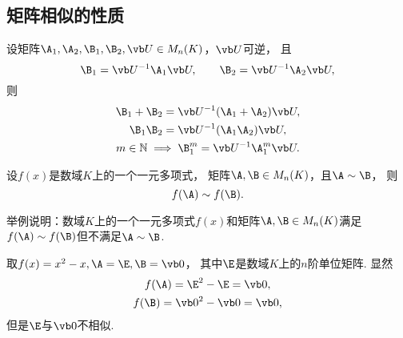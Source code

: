 \subsection{矩阵相似的性质}
\begin{proposition}
设矩阵\(\A_1,\A_2,\B_1,\B_2,\P \in M_n(K)\)，\(\P\)可逆，
且\[
	\B_1=\P^{-1}\A_1\P, \qquad
	\B_2=\P^{-1}\A_2\P,
\]
则\begin{gather}
	\B_1 + \B_2 = \P^{-1} (\A_1 + \A_2) \P, \\
	\B_1 \B_2 = \P^{-1} (\A_1 \A_2) \P, \\
	m\in\mathbb{N} \implies \B_1^m = \P^{-1}\A_1^m\P.
		\label{equation:相似矩阵.利用相似性简化计算}
\end{gather}
\end{proposition}
\begin{corollary}\label{theorem:相似矩阵.相似矩阵的多项式相似}
设\(f(x)\)是数域\(K\)上的一个一元多项式，
矩阵\(\A,\B \in M_n(K)\)，且\(\A \sim \B\)，
则\[
	f(\A) \sim f(\B).
\]
\end{corollary}
\begin{example}
举例说明：数域\(K\)上的一个一元多项式\(f(x)\)和矩阵\(\A,\B \in M_n(K)\)满足\(f(\A) \sim f(\B)\)但不满足\(\A \sim \B\).
\begin{solution}
取\(f(x) = x^2 - x,
\A = \E,
\B = \vb0\)，
其中\(\E\)是数域\(K\)上的\(n\)阶单位矩阵.
显然\begin{gather*}
	f(\A) = \E^2 - \E = \vb0, \\
	f(\B) = \vb0^2 - \vb0 = \vb0,
\end{gather*}
但是\(\E\)与\(\vb0\)不相似.
\end{solution}
\end{example}

